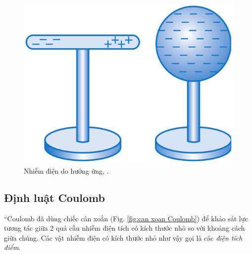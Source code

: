 \documentclass[oneside]{book}
\numberwithin{equation}{section}
\begin{document}
\begin{figure}[H]
	\centering
	\includegraphics[scale=0.15]{nhiem_dien_do_huong_ung}
	\caption{Nhiễm điện do hưởng ứng, \cite[Hình 1.4, p. 7]{SGK_Vat_Ly_11_nang_cao}.}
	\label{fig:nhiem dien do huong ung}
\end{figure}

\subsection{Định luật Coulomb}
``Coulomb đã dùng chiếc cân xoắn (Fig. \ref{fig:can xoan Coulomb}) để khảo sát lực tương tác giữa 2 quả cầu nhiễm điện tích có kích thước nhỏ so với khoảng cách giữa chúng. Các vật nhiễm điện có kích thước nhỏ như vậy gọi là các \textit{điện tích điểm}.
\end{document}
